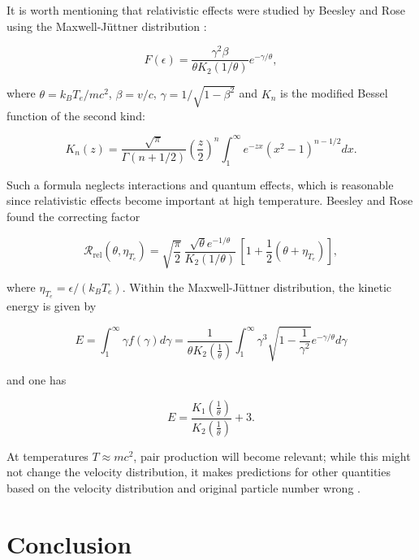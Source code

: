 \documentclass[a4paper,10pt]{article}
\begin{document}
It is worth mentioning that relativistic effects were studied by Beesley and Rose \cite{BEESLEY19} using the Maxwell-J\"uttner distribution \cite{JUTTNER11,SYNGE}:

\begin{equation*}
F(\epsilon)=\frac{\gamma^2\beta}{\theta K_2(1/\theta)}e^{-\gamma/\theta},
\end{equation*}

\noindent where $\theta=k_BT_e/mc^2$, $\beta=v/c$, $\gamma=1/\sqrt{1-\beta^2}$ and $K_n$ is the modified Bessel function of the second kind:

\begin{equation*}
K_n(z)=\frac{\sqrt{\pi}}{\Gamma(n+1/2)}\left(\frac{z}{2}\right)^n\int_1^{\infty}e^{-zx}\left(x^2-1\right)^{n-1/2}dx.
\end{equation*}

\noindent Such a formula neglects interactions and quantum effects, which is reasonable since relativistic effects become important at high temperature. Beesley and Rose found the correcting factor

\begin{equation*}
\mathcal{R}_{\mathrm{rel}}\left(\theta,\eta_{T_e}\right)=\sqrt{\frac{\pi}{2}}\,\frac{\sqrt{\theta}e^{-1/\theta}}{K_2(1/\theta)}\,\left[1+\frac{1}{2}\left(\theta+\eta_{T_e}\right)\right],
\end{equation*}

\noindent where $\eta_{T_e}=\epsilon/\left(k_BT_e\right)$. Within the Maxwell-J\"uttner distribution, the kinetic energy is given by

\begin{equation}
E=\int_1^{\infty}\gamma f(\gamma)d\gamma=\frac{1}{\theta K_2\left(\frac{1}{\theta}\right)}\int_1^{\infty}\gamma^3\sqrt{1-\frac{1}{\gamma^2}}e^{-\gamma/\theta}d\gamma
\end{equation}

\noindent and one has

\begin{equation}
E=\frac{K_1\left(\frac{1}{\theta}\right)}{K_2\left(\frac{1}{\theta}\right)}+3.
\end{equation}

At temperatures $T\approx mc^2$, pair production will become relevant; while this might not change the velocity distribution, it makes predictions for other quantities based on the velocity distribution and original particle number wrong \cite{singh13}.

\section{Conclusion}\label{sec7}
\end{document}
